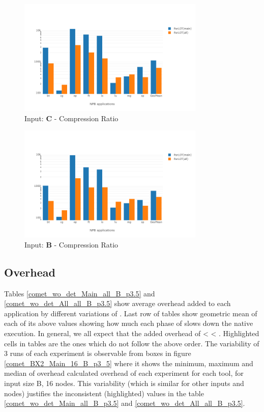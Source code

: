 


\begin{figure}[!t]
\centering
\includegraphics[width=3.5in]{figs.comet.newMed/comet_chartAvg_cr_C_p3_5.png}
\caption{ Input: \textbf{C}  - Compression Ratio
}
\label{comet_chartAvg_cr_C_p3_5}
\end{figure}


\begin{figure}[!t]
\centering
\includegraphics[width=3.5in]{figs.comet.newMed/comet_chartAvg_cr_B_p3_5.png}
\caption{ Input: \textbf{B}  - Compression Ratio
}
\label{comet_chartAvg_cr_B_p3_5}
\end{figure}
  
  
\subsection{ \pininit Overhead} 
\label{subsec:pinit}
Tables \ref{comet_wo_det_Main_all_B_p3.5} and \ref{comet_wo_det_All_all_B_p3.5} show average overhead added to each application by different variations of \parlot. Last row of tables show geometric mean of each of its above values showing how much each phase of \parlot slows down the native execution. In general, we all expect that the added overhead of  \pininit < \parlot < \parlotnc. Highlighted cells in tables are the ones which do not follow the above order. The variability of 3 runs of each experiment is observable from boxes in figure \ref{comet_BX2_Main_16_B_p3_5} where it shows the minimum, maximum and median of overhead calculated overhead of each experiment for each tool, for input size B, 16 nodes.
This variability (which is similar for other inputs and nodes) justifies the inconsistent (highlighted) values in the table \ref{comet_wo_det_Main_all_B_p3.5} and \ref{comet_wo_det_All_all_B_p3.5}.


